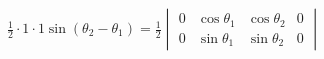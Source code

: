 \documentclass[preview]{standalone}
\begin{document}
\begin{align*}
\frac{1}{2}\cdot1\cdot1\sin(\theta_2 - \theta_1)=\frac{1}{2}\begin{vmatrix} 0 & \cos\theta_1 & \cos\theta_2 & 0 \\ 0 &  \sin\theta_1& \sin\theta_2 & 0 \end{vmatrix}
\end{align*}
\end{document}
